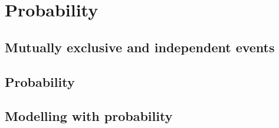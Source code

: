 \chapter{Probability}

\section{Mutually exclusive and independent events}
\section{Probability}
\section{Modelling with probability}